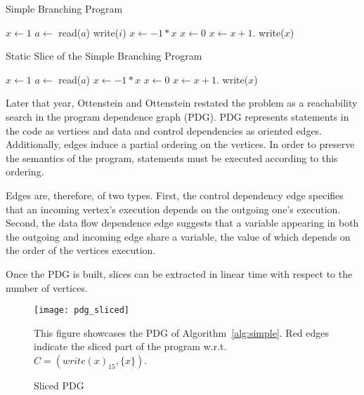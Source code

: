\begin{minipage}{0.46\textwidth}
\begin{algorithm}[H]
	\centering
	\caption{Simple Branching Program}
	\label{alg:simple}
	\begin{algorithmic}[1]
		\State $x \leftarrow 1$
		\State $a \leftarrow$ read($a$)
			\State write($i$)
		\EndFor
				\State $x \leftarrow -1 * x$
			\Else
				\State $x \leftarrow 0$
			\EndIf
		\Else
			\State $x \leftarrow x + 1$.
		\EndIf
		\State write($x$)
	\end{algorithmic}
\end{algorithm}
\end{minipage}
\hfill
\begin{minipage}{0.46\textwidth}
\begin{algorithm}[H]
	\centering
	\caption{Static Slice of the Simple Branching Program} 
	\begin{algorithmic}[1]
		\State $x \leftarrow 1$
		\State $a \leftarrow$ read($a$)
				\State $x \leftarrow -1 * x$
			\Else
				\State $x \leftarrow 0$
			\EndIf
		\Else
			\State $x \leftarrow x + 1$.
		\EndIf
		\State write($x$)
	\end{algorithmic}
\end{algorithm}
\end{minipage}

Later that year, Ottenstein and Ottenstein restated the problem as a reachability
search in the program dependence graph (PDG).
PDG represents statements in the code as vertices and data and control
dependencies as oriented edges. 
Additionally, edges induce a partial ordering on the vertices. 
In order to preserve the semantics of the program, statements must be executed 
according to this ordering. 

Edges are, therefore, of two types. 
First, the control dependency edge specifies that an incoming vertex's 
execution depends on the outgoing one's execution. 
Second, the data flow dependence edge suggests that a variable appearing
in both the outgoing and incoming edge share a variable,
the value of which depends on the order of the vertices execution.

Once the PDG is built, slices can be extracted in linear time 
with respect to the number of vertices.


\begin{figure}[t]
\texttt{[image: pdg\_sliced]}
\centering
\caption{Sliced PDG}
This figure showcases the PDG of Algorithm~\ref{alg:simple}.
Red edges indicate the sliced part of the program w.r.t.
$C = (write(x)_{15}, \{x\})$.
\end{figure}


